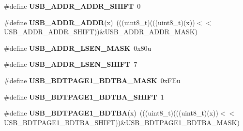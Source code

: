 \begin{DoxyCompactItemize}
\item 
\#define {\bfseries U\+S\+B\+\_\+\+A\+D\+D\+R\+\_\+\+A\+D\+D\+R\+\_\+\+S\+H\+I\+FT}~0\hypertarget{group__USB__Register__Masks_ga57c7c394504da946dae75d5b20a2f297}{}\label{group__USB__Register__Masks_ga57c7c394504da946dae75d5b20a2f297}

\item 
\#define {\bfseries U\+S\+B\+\_\+\+A\+D\+D\+R\+\_\+\+A\+D\+DR}(x)~(((uint8\+\_\+t)(((uint8\+\_\+t)(x))$<$$<$U\+S\+B\+\_\+\+A\+D\+D\+R\+\_\+\+A\+D\+D\+R\+\_\+\+S\+H\+I\+FT))\&U\+S\+B\+\_\+\+A\+D\+D\+R\+\_\+\+A\+D\+D\+R\+\_\+\+M\+A\+SK)\hypertarget{group__USB__Register__Masks_gad42e50014eedee91315521b19199ef39}{}\label{group__USB__Register__Masks_gad42e50014eedee91315521b19199ef39}

\item 
\#define {\bfseries U\+S\+B\+\_\+\+A\+D\+D\+R\+\_\+\+L\+S\+E\+N\+\_\+\+M\+A\+SK}~0x80u\hypertarget{group__USB__Register__Masks_ga695e1ebe159d45ecd94fe40627ac121e}{}\label{group__USB__Register__Masks_ga695e1ebe159d45ecd94fe40627ac121e}

\item 
\#define {\bfseries U\+S\+B\+\_\+\+A\+D\+D\+R\+\_\+\+L\+S\+E\+N\+\_\+\+S\+H\+I\+FT}~7\hypertarget{group__USB__Register__Masks_ga7c81adb1ac1c658006ea0ebfd4644634}{}\label{group__USB__Register__Masks_ga7c81adb1ac1c658006ea0ebfd4644634}

\item 
\#define {\bfseries U\+S\+B\+\_\+\+B\+D\+T\+P\+A\+G\+E1\+\_\+\+B\+D\+T\+B\+A\+\_\+\+M\+A\+SK}~0x\+F\+Eu\hypertarget{group__USB__Register__Masks_gacd2b27fefcff6f79e930e76d2a1a7b26}{}\label{group__USB__Register__Masks_gacd2b27fefcff6f79e930e76d2a1a7b26}

\item 
\#define {\bfseries U\+S\+B\+\_\+\+B\+D\+T\+P\+A\+G\+E1\+\_\+\+B\+D\+T\+B\+A\+\_\+\+S\+H\+I\+FT}~1\hypertarget{group__USB__Register__Masks_ga50c84ff08884c9825cf6c513f11aabe4}{}\label{group__USB__Register__Masks_ga50c84ff08884c9825cf6c513f11aabe4}

\item 
\#define {\bfseries U\+S\+B\+\_\+\+B\+D\+T\+P\+A\+G\+E1\+\_\+\+B\+D\+T\+BA}(x)~(((uint8\+\_\+t)(((uint8\+\_\+t)(x))$<$$<$U\+S\+B\+\_\+\+B\+D\+T\+P\+A\+G\+E1\+\_\+\+B\+D\+T\+B\+A\+\_\+\+S\+H\+I\+FT))\&U\+S\+B\+\_\+\+B\+D\+T\+P\+A\+G\+E1\+\_\+\+B\+D\+T\+B\+A\+\_\+\+M\+A\+SK)\hypertarget{group__USB__Register__Masks_gaab031dcfd0867133f1d23dd92ef695ad}{}\label{group__USB__Register__Masks_gaab031dcfd0867133f1d23dd92ef695ad}


\end{DoxyCompactItemize}
